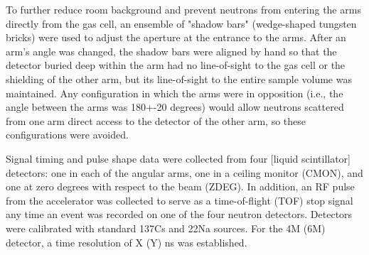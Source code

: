     To further reduce room background and prevent neutrons from entering the arms directly
    from the gas cell, an ensemble of "shadow bars" (wedge-shaped tungsten bricks)
    were used to adjust the aperture at the entrance to the arms. After an arm's
    angle was changed, the shadow bars were aligned by hand so that the
    detector buried deep within the arm had no line-of-sight to the gas cell or the
    shielding of the other arm, but its line-of-sight to the entire sample volume was
    maintained. Any configuration in which the arms were in opposition (i.e., the
            angle between the arms was 180+-20 degrees) would allow neutrons scattered
    from one arm direct access to the detector of the other arm, so these
    configurations were avoided.

    Signal timing and pulse shape data were collected from four [liquid scintillator]
    detectors: one in each of the angular arms, one in a ceiling monitor
    (CMON), and one at zero degrees with respect to the beam (ZDEG). In addition,
    an RF pulse from the accelerator was collected to serve as a time-of-flight
    (TOF) stop signal any time an event was recorded on one of the four neutron
    detectors. Detectors were calibrated with standard 137Cs and 22Na sources. For
    the 4M (6M) detector, a time resolution of X (Y) ns was established.
